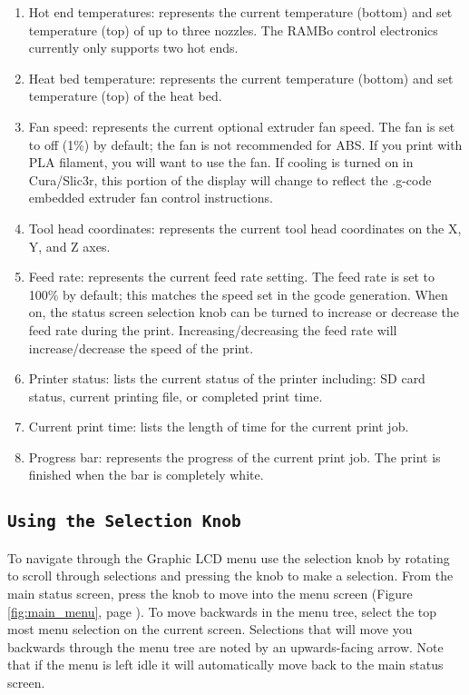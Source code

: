 \begin{enumerate}
\item Hot end temperatures: represents the current temperature (bottom) and set temperature (top) of up to three nozzles. The RAMBo control electronics currently only supports two hot ends.
\item Heat bed temperature: represents the current temperature (bottom) and set temperature (top) of the heat bed.
\item Fan speed: represents the current optional extruder fan speed. The fan is set to off (1\%) by default; the fan is not recommended for ABS. If you print with PLA filament, you will want to use the fan. If cooling is turned on in Cura/Slic3r, this portion of the display will change to reflect the .g-code embedded extruder fan control instructions.
\item Tool head coordinates: represents the current tool head coordinates on the X, Y, and Z axes.
\item Feed rate: represents the current feed rate setting. The feed rate is set to 100\% by default; this matches the speed set in the gcode generation. When on, the status screen selection knob can be turned to increase or decrease the feed rate during the print. Increasing/decreasing the feed rate will increase/decrease the speed of the print.
\item Printer status: lists the current status of the printer including: SD card status, current printing file, or completed print time.
\item Current print time: lists the length of time for the current print job.
\item Progress bar: represents the progress of the current print job. The print is finished when the bar is completely white.
\end{enumerate}


\subsection{\texttt{Using the Selection Knob}}
To navigate through the Graphic LCD menu use the selection knob by rotating to scroll through selections and pressing the knob to make a selection. From the main status screen, press the knob to move into the menu screen (Figure \ref{fig:main_menu}, page \pageref{fig:main_menu}). To move backwards in the menu tree, select the top most menu selection on the current screen. Selections that will move you backwards through the menu tree are noted by an upwards-facing arrow. Note that if the menu is left idle it will automatically move back to the main status screen.

